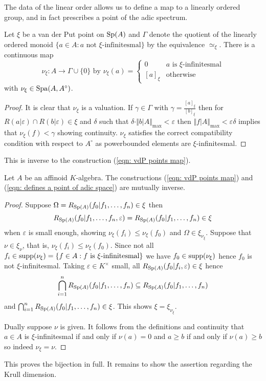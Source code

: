 The data of the linear order allows us to define a map to a linearly ordered group, and in fact prescribes a point of the adic spectrum. 
\begin{proposition}
    Let $\xi$ be a van der Put point on $\mathrm{Sp}(A)$ and $\Gamma$ denote the quotient of the linearly ordered monoid $\{a\in A:a\text{ not }\xi\text{-infinitesmal}\}$ by the equivalence $\simeq_{\xi}$. There is a continuous map 
    \begin{equation}\label{eqn: defines a point of adic space}
        \nu_{\xi}:A\to\Gamma\cup\{0\}\text{ by }\nu_{\xi}(a)=\begin{cases}
            0 & a\text{ is }\xi\text{-infinitesmal} \\
            [a]_{\xi} & \text{otherwise}
        \end{cases}
    \end{equation}
    with $\nu_{\xi}\in\mathrm{Spa}(A,A^{\circ})$. 
\end{proposition}
\begin{proof}
    It is clear that $\nu_{\xi}$ is a valuation. If $\gamma\in\Gamma$ with $\gamma=\frac{[a]_{\xi}}{[b]_{\xi}}$ then for $R(a|\varepsilon)\cap R(b|\varepsilon)\in\xi$ and $\delta$ such that $\delta\cdot\Vert b|A\Vert_{\max}<\varepsilon$ then $\Vert f|A\Vert_{\max}<\varepsilon\delta$ implies that $\nu_{\xi}(f)<\gamma$ showing continuity. $\nu_{\xi}$ satisfies the correct compatibility condition with respect to $A^{\circ}$ as powerbounded elements are $\xi$-infinitesmal. 
\end{proof}
This is inverse to the construction (\ref{eqn: vdP points map}). 
\begin{proposition}\label{prop: mutually inverse}
    Let $A$ be an affinoid $K$-algebra. The constructions (\ref{eqn: vdP points map}) and (\ref{eqn: defines a point of adic space}) are mutually inverse. 
\end{proposition}
\begin{proof}
    Suppose $\Omega=R_{\mathrm{Sp}(A)}(f_{0}|f_{1},\dots,f_{n})\in\xi$ then $$R_{\mathrm{Sp}(A)}(f_{0}|f_{1},\dots,f_{n},\varepsilon)=R_{\mathrm{Sp}(A)}(f_{0}|f_{1},\dots,f_{n})\in\xi$$ when $\varepsilon$ is small enough, showing $\nu_{\xi}(f_{i})\leq\nu_{\xi}(f_{0})$ and $\Omega\in\xi_{\nu_{\xi}}$. Suppose that $\nu\in\xi_{\nu}$, that is, $\nu_{\xi}(f_{i})\leq\nu_{\xi}(f_{0})$. Since not all $f_{i}\in\mathrm{supp}(\nu_{\xi})=\{f\in A:f\text{ is }\xi\text{-infinitesmal}\}$ we have $f_{0}\in\mathrm{supp}(\nu_{\xi})$ hence $f_{0}$ is not $\xi$-infinitesmal. Taking $\varepsilon\in K^{\times}$ small, all $R_{\mathrm{Sp}(A)}(f_{0}|f_{i},\varepsilon)\in\xi$ hence 
    $$\bigcap_{i=1}^{n}R_{\mathrm{Sp}(A)}(f_{0}|f_{1},\dots,f_{n})\subseteq R_{\mathrm{Sp}(A)}(f_{0}|f_{1},\dots,f_{n})$$ and $\bigcap_{i=1}^{n}R_{\mathrm{Sp}(A)}(f_{0}|f_{1},\dots,f_{n})\in\xi$. This shows $\xi=\xi_{\nu_{\xi}}$. 

    Dually suppose $\nu$ is given. It follows from the definitions and continuity that $a\in A$ is $\xi$-infinitesmal if and only if $\nu(a)=0$ and $a\geq b$ if and only if $\nu(a)\geq b$ so indeed $\nu_{\xi}=\nu$. 
\end{proof}
This proves the bijection in full. It remains to show the assertion regarding the Krull dimension. 


